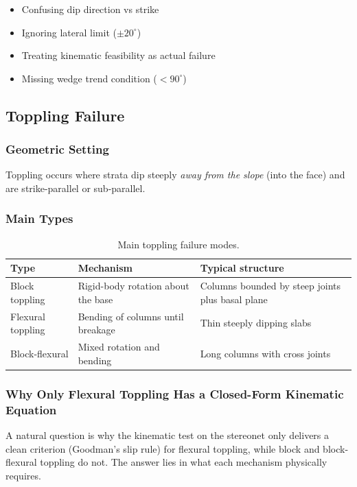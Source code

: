 \documentclass[a4paper,12pt]{article}
\begin{document}
\begin{warnbox}
\begin{itemize}[nosep]
    \item Confusing dip direction vs strike
    \item Ignoring lateral limit ($\pm 20^\circ$)
    \item Treating kinematic feasibility as actual failure
    \item Missing wedge trend condition ($< 90^\circ$)
\end{itemize}
\end{warnbox}

\subsection{Toppling Failure}

\subsubsection{Geometric Setting}
Toppling occurs where strata dip steeply \emph{away from the slope} (into the face) and are strike-parallel or sub-parallel.

\subsubsection{Main Types}
\begin{table}[h!]
\centering
\begin{tabularx}{\textwidth}{l X X}
\toprule
\textbf{Type} & \textbf{Mechanism} & \textbf{Typical structure} \\
\midrule
Block toppling & Rigid-body rotation about the base & Columns bounded by steep joints plus basal plane \\
Flexural toppling & Bending of columns until breakage & Thin steeply dipping slabs \\
Block-flexural & Mixed rotation and bending & Long columns with cross joints \\
\bottomrule
\end{tabularx}
\caption{Main toppling failure modes.}
\end{table}

\subsubsection{Why Only Flexural Toppling Has a Closed-Form Kinematic Equation}

A natural question is why the kinematic test on the stereonet only delivers a clean criterion (Goodman's slip rule) for flexural toppling, while block and block-flexural toppling do not. The answer lies in what each mechanism physically requires.
\end{document}
